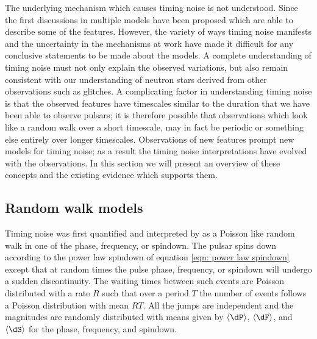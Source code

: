 The underlying mechanism which causes timing noise is not understood. Since the
first discussions in \citet{Boynton1972} multiple models have been proposed
which are able to describe some of the features. However, the variety of ways
timing noise manifests and the uncertainty in the mechanisms at work have made
it difficult for any conclusive statements to be made about the models. A
complete understanding of timing noise must not only explain the observed
variations, but also remain consistent with our understanding of neutron stars
derived from other observations such as glitches. A complicating factor in
understanding timing noise is that the observed features have timescales
similar to the duration that we have been able to observe pulsars; it is
therefore possible that observations which look like a random walk over a short
timescale, may in fact be periodic or something else entirely over longer
timescales.  Observations of new features prompt new models for timing noise;
as a result the timing noise interpretations have evolved with the
observations. In this section we will present an overview of these concepts and
the existing evidence which supports them.

\subsection{Random walk models}
\label{sec: TN interpretations random walk models}

Timing noise was first quantified and interpreted by \citet{Boynton1972} as a
Poisson like random walk in one of the phase, frequency, or spindown. The
pulsar spins down according to the power law spindown of equation \eqref{eqn:
power law spindown} except that at random times the pulse phase, frequency, or
spindown will undergo a sudden discontinuity. The waiting times between such events
are Poisson distributed with a rate $R$ such that over a period $T$ the number of
events follows a Poisson distribution with mean $RT$. All the jumps are
independent and the magnitudes are randomly distributed with means given by
$\langle\dP\rangle$, $\langle\dF\rangle$, and $\langle\dS\rangle$ for the phase,
frequency, and spindown.

